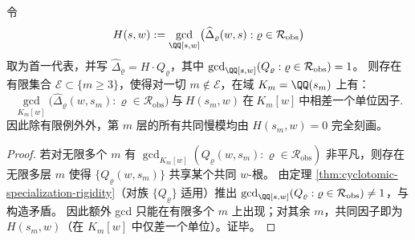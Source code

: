 \begin{theorem}\label{thm:cyclotomic-gcd-stability}
令
\[
H(s,w):=\gcd_{\QQ[s,w]}\bigl(\widehat{\Delta}_{\varrho}(w,s):\varrho\in\mathcal{R}_{\mathrm{obs}}\bigr)
\]
取为首一代表，并写 \(\widehat{\Delta}_{\varrho}=H\cdot Q_{\varrho}\)，其中
\(
\gcd_{\QQ[s,w]}(Q_{\varrho}:\varrho\in\mathcal{R}_{\mathrm{obs}})=1
\)。
则存在有限集合 \(\mathcal{E}\subset\{m\ge 3\}\)，使得对一切 \(m\notin\mathcal{E}\)，在域 \(K_m=\QQ(s_m)\) 上有：
\[
\gcd_{K_m[w]}\bigl(\widehat{\Delta}_{\varrho}(w,s_m):\varrho\in\mathcal{R}_{\mathrm{obs}}\bigr)
\ \text{与}\ H(s_m,w)\ \text{在}\ K_m[w]\ \text{中相差一个单位因子}.
\]
因此除有限例外外，第 \(m\) 层的所有共同慢模均由 \(H(s_m,w)=0\) 完全刻画。
\end{theorem}
\begin{proof}
若对无限多个 \(m\) 有
\(
\gcd_{K_m[w]}(Q_{\varrho}(w,s_m):\varrho\in\mathcal{R}_{\mathrm{obs}})
\)
非平凡，则存在无限多层 \(m\) 使得 \(\{Q_{\varrho}(w,s_m)\}\) 共享某个共同 \(w\)-根。
由定理 \ref{thm:cyclotomic-specialization-rigidity}（对族 \(\{Q_{\varrho}\}\) 适用）推出
\(
\gcd_{\QQ[s,w]}(Q_{\varrho}:\varrho\in\mathcal{R}_{\mathrm{obs}})\neq 1
\)，与构造矛盾。
因此额外 gcd 只能在有限多个 \(m\) 上出现；对其余 \(m\)，共同因子即为 \(H(s_m,w)\)（在 \(K_m[w]\) 中仅差一个单位）。证毕。
\end{proof}

